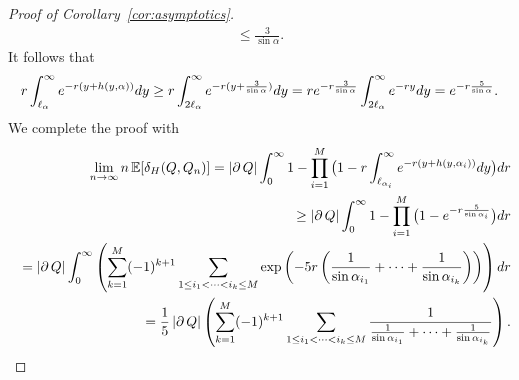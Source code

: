 \documentclass[a4paper,12pt]{article}
\theoremstyle{definition}
\newcommand{\IE}{\mathbb{E}}
\newcommand{\dd}{{\rm d}}
\begin{document}
\begin{proof}[Proof of Corollary~\ref{cor:asymptotics}]
\begin{eqnarray*}
\leq\frac{3}{\sin\alpha}.
\end{eqnarray*}
It follows that
\[
r\int_{\ell_{\alpha}}^{\infty}e^{-r(y+h(y,\alpha))}\dd y
\geq r\int_{2\ell_{\alpha}}^{\infty}e^{-r(y+\frac{3}{\sin\alpha})}\dd y
=re^{-r\frac{3}{\sin\alpha}}\int_{2\ell_{\alpha}}^{\infty}e^{-ry}\dd y
=e^{-r\frac{5}{\sin\alpha}}.
\]
We complete the proof with 
\begin{eqnarray*}
&&\lim_{n\to\infty}n \, \IE[\delta_H(Q,Q_n)]
= \left| \partial \, Q \right| \int_{0}^{\infty}1-\prod_{i=1}^M\big(1-r\int_{\ell_{\alpha_i}}^{\infty}e^{-r(y+h(y,\alpha_i))}\dd y\big)\dd r
\\
&&\geq\left| \partial \, Q \right| \int_{0}^{\infty}1-\prod_{i=1}^M
\big(1-e^{-r\frac{5}{\sin\alpha_{i}}}\big)\dd r
\\
&&=\left| \partial \, Q \right| \int_{0}^{\infty}\left(\sum_{k=1}^{M}(-1)^{k+1}\sum_{1\leq i_{1}<\cdots<i_{k}\leq M}
\exp\left(-5r\left(\frac{1}{\sin\alpha_{i_{1}}}+\cdots+\frac{1}{\sin\alpha_{i_{k}}}\right)\right)
\right)\dd r
\\
&&=\frac{1}{5}\left| \partial \, Q \right| \left(\sum_{k=1}^{M}(-1)^{k+1}\sum_{1\leq i_{1}<\cdots<i_{k}\leq M}
\frac{1}{\frac{1}{\sin\alpha_{i_{1}}}+\cdots+\frac{1}{\sin\alpha_{i_{k}}}}
\right).
\end{eqnarray*}
\end{proof}
\end{document}
